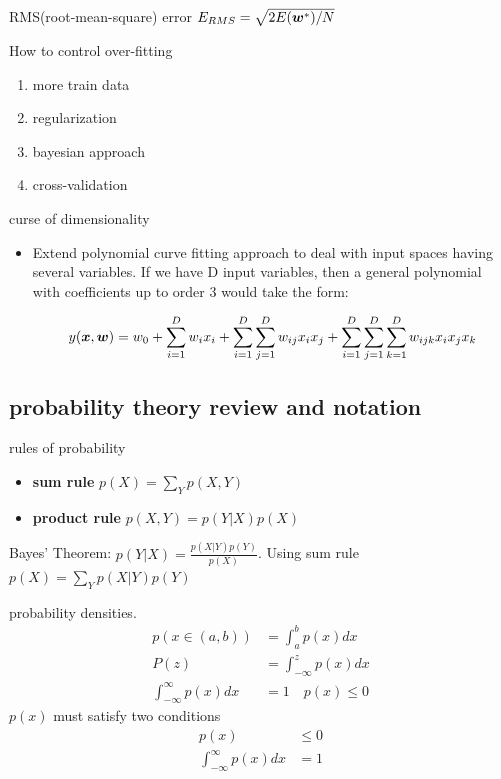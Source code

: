 \documentclass[11pt]{article}
\begin{document}
RMS(root-mean-square) error \(E_{RMS}=\sqrt{2E(\boldsymbol{w}^*)/N}\)


How to control over-fitting
\begin{enumerate}
\item more train data
\item regularization
\item bayesian approach
\item cross-validation
\end{enumerate}


curse of dimensionality
\begin{itemize}
\item Extend polynomial curve fitting approach to deal with input spaces having
several variables. If we have D input variables, then a general polynomial
with coefficients up to order 3 would take the form:

\begin{equation*}
y(\boldsymbol{x},\boldsymbol{w})=w_0+\displaystyle\sum_{i=1}^Dw_ix_i+
\displaystyle\sum_{i=1}^D \displaystyle\sum_{j=1}^Dw_{ij}x_ix_j+
\displaystyle\sum_{i=1}^D \displaystyle\sum_{j=1}^D
\displaystyle\sum_{k=1}^Dw_{ijk}x_ix_jx_k
\end{equation*}
\end{itemize}
\subsection{probability theory review and notation}
\label{sec:org6ed1626}
rules of probability
\begin{itemize}
\item \textbf{sum rule} \(p(X)=\displaystyle\sum_Yp(X,Y)\)
\item \textbf{product rule} \(p(X,Y)=p(Y|X)p(X)\)
\end{itemize}

Bayes' Theorem: \(p(Y|X)=\frac{p(X|Y)p(Y)}{p(X)}\). Using sum rule
\(p(X)=\displaystyle\sum_Yp(X|Y)p(Y)\)

probability densities. 
\begin{align*}
p(x\in(a,b))&=\int_a^bp(x)dx\\
P(z)&=\int_{-\infty}^z p(x)dx\\
\int_{-\infty}^\infty p(x)dx&=1\quad p(x)\le0
\end{align*}
\(p(x)\) must satisfy two conditions
\begin{align*}
p(x)&\le 0\\
\int_{-\infty}^\infty p(x)dx&=1
\end{align*}
\end{document}
